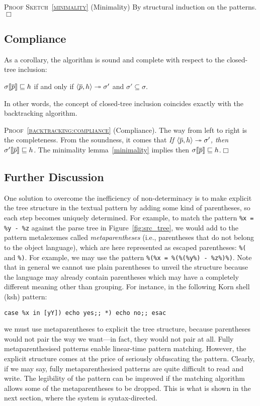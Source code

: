 \noindent\textsc{Proof Sketch~\ref{minimality}} (Minimality) By
structural induction on the patterns.\hfill\(\Box\)

\subsection{Compliance}

As a corollary, the algorithm is sound and complete with respect to
the closed\hyp{}tree inclusion:
\begin{corollary}[Compliance]\hfill
\label{backtracking:compliance}
\begin{center}
\(\subst{\overline{p}}{\sigma} \sqsubseteq h\) if and only if
\(\smat{h}{\overline{p}} \twoheadrightarrow \sigma'\) 
and  \(\sigma' \subseteq \sigma\).
\end{center}
\end{corollary}
\noindent In other words, the concept of closed\hyp{}tree inclusion
coincides exactly with the backtracking algorithm.

\noindent\textsc{Proof~\ref{backtracking:compliance}}
(Compliance). The way from left to right is the completeness. From the
soundness, it comes that
\emph{If \(\smat{h}{\overline{p}} \twoheadrightarrow \sigma'\), then
\(\subst{\overline{p}}{\sigma'} \sqsubseteq h\).}
The minimality lemma~\ref{minimality} implies then
\(\subst{\overline{p}}{\sigma} \sqsubseteq h\).\hfill\(\Box\)

\subsection{Further Discussion}

One solution to overcome the inefficiency of non\hyp{}determinacy is
to make explicit the tree structure in the textual pattern by adding
some kind of parentheses, so each step becomes uniquely
determined. For example, to match the pattern \texttt{\%x = \%y - \%z}
against the parse tree in Figure~\ref{fig:src_tree}, we would add to
the pattern meta\-lexemes called \emph{meta\-parentheses} (i.e.,
parentheses that do not belong to the object language), which are here
represented as escaped parentheses: \texttt{\%(} and \texttt{\%)}. For
example, we may use the pattern \texttt{\%(\%x = \%(\%(\%y\%) -
\%z\%)\%)}. Note that in general we cannot use plain parentheses to
unveil the structure because the language may already contain
parentheses which may have a completely different meaning other than
grouping. For instance, in the following \textsf{Korn shell}
(\textsf{ksh}) pattern:
\begin{verbatim} 
case %x in [yY]) echo yes;; *) echo no;; esac
\end{verbatim}
we must use meta\-parentheses to explicit the tree structure, because
parentheses would not pair the way we want---in fact, they would not
pair at all. Fully meta\-parenthesised patterns enable
linear\hyp{}time pattern matching. However, the explicit structure
comes at the price of seriously obfuscating the pattern. Clearly, if
we may say, fully meta\-parenthesised patterns are quite difficult to
read and write. The legibility of the pattern can be improved if the
matching algorithm allows some of the meta\-parentheses to be
dropped. This is what is shown in the next section, where the system
is syntax\hyp{}directed.
